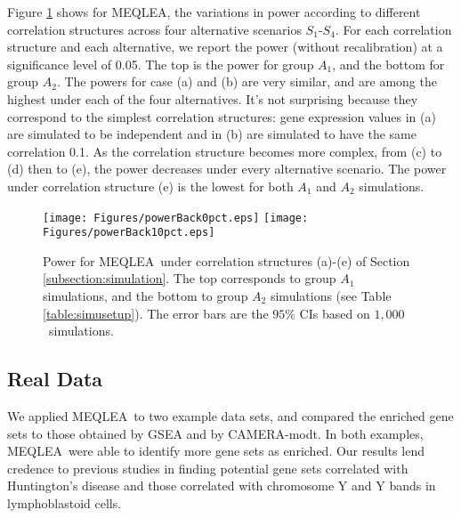 \documentclass[useAMS,usenatbib, galley]{biom}
\newcommand{\OurMethod}{MEQLEA}
\newcommand{\aaCase}{a}
\newcommand{\aCase}{c}
\newcommand{\cCase}{b}
\newcommand{\eCase}{d}
\newcommand{\fCase}{e}
\newcommand{\CMT}{CAMERA-modt}
\newcommand{\HowmanySimu}{$1,000$}
\begin{document}
	Figure \ref{fig:power} shows for \OurMethod, the variations in power according to different correlation structures across four alternative scenarios $S_1$-$S_4$. For each correlation structure and each alternative, we report the power (without recalibration) at a significance level of 0.05. The top is the power for group $A_1$, and the bottom for group $A_2$.  The powers for case (\aaCase) and (\cCase) are very similar, and are among the highest under each of the four alternatives. It's not surprising because they correspond to the simplest correlation structures: gene expression values in (\aaCase) are simulated to be independent and in (\cCase) are simulated to have the same correlation 0.1. As the correlation structure becomes more complex, from (\aCase) to (\eCase) then to (\fCase), the power decreases under every alternative scenario. The power under correlation structure (\fCase) is the lowest for both $A_1$ and $A_2$ simulations.%
	
\begin{figure}
	\begin{center}
		\texttt{[image: Figures/powerBack0pct.eps]}
		\texttt{[image: Figures/powerBack10pct.eps]}
	\end{center} 
		\caption{Power for \OurMethod~under correlation structures (\aaCase)-(\fCase) of Section \ref{subsection:simulation}. The top corresponds to group $A_1$ simulations, and the bottom to group $A_2$ simulations (see Table \ref{table:simusetup}). The error bars are the $95\%$ CIs based on \HowmanySimu~simulations. }\label{fig:power}
\end{figure} 
	
	\subsection{Real Data}\label{section:realdata}
	We applied \OurMethod~to two example data sets, and compared the enriched gene sets to those obtained by GSEA and by \CMT. In both examples, \OurMethod~were able to identify more gene sets as enriched. Our results lend credence to previous studies in finding potential gene sets correlated with Huntington's disease and those correlated with chromosome Y and Y bands in lymphoblastoid cells.  
	
\end{document}
